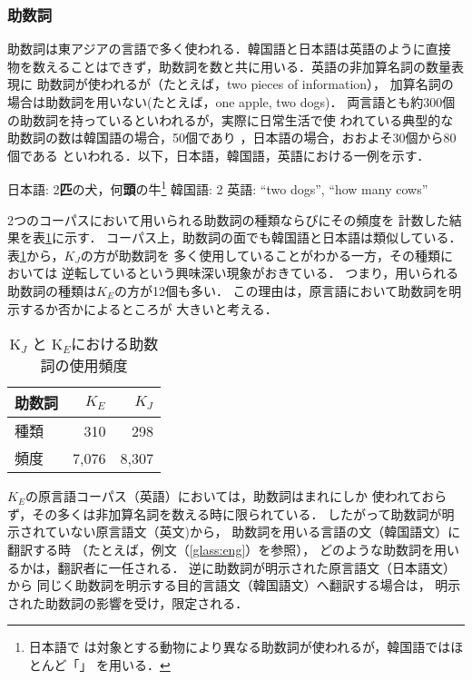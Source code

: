 \subsubsection{助数詞}
\label{num-cl}
助数詞は東アジアの言語で多く使われる．韓国語と日本語は英語のように直接
物を数えることはできず，助数詞を数と共に用いる．英語の非加算名詞の数量表現に
助数詞が使われるが（たとえば，two pieces of information），
加算名詞の場合は助数詞を用いない(たとえば，one apple, two dogs)．
両言語とも約300個の助数詞を持っているといわれるが，実際に日常生活で使
われている典型的な助数詞の数は韓国語の場合，50個であり
\cite{Unterbeck:1994}，日本語の場合，おおよそ30個から80個である
\cite{Downing:1996}といわれる．以下，日本語，韓国語，英語における一例を示す．
\begin{exe}
  \ex 
  \begin{xlist}
    \ex 日本語: 2{\bf 匹}の犬，何{\bf 頭}の牛\footnote{日本語で
    は対象とする動物により異なる助数詞が使われるが，韓国語ではほとんど「」
    を用いる．}
 \ex 韓国語: 2  
    
  \ex 英語: ``two dogs'',  ``how many cows''
  \end{xlist}
\end{exe}


2つのコーパスにおいて用いられる助数詞の種類ならびにその頻度を
計数した結果を表\ref{tab:classifier}に示す．
コーパス上，助数詞の面でも韓国語と日本語は類似している．
表\ref{tab:classifier}から，$K_J$の方が助数詞を
多く使用していることがわかる一方，その種類においては
逆転しているという興味深い現象がおきている．
つまり，用いられる助数詞の種類は$K_E$の方が12個も多い．
この理由は，原言語において助数詞を明示するか否かによるところが
大きいと考える．

\begin{table}[htb]
\begin{center}
\caption{K$_J$ と K$_E$における助数詞の使用頻度}
\label{tab:classifier}
\begin{tabular}{l|r|r}     
\hline
\hline
助数詞   &  $K_E$ &  $K_J$  \\ \hline
種類  & 310     &  298    \\
頻度 &  7,076  & 8,307  \\
\hline\hline
\end{tabular}
\end{center}
\end{table}


$K_E$の原言語コーパス（英語）においては，助数詞はまれにしか
使われておらず，その多くは非加算名詞を数える時に限られている．
したがって助数詞が明示されていない原言語文（英文)から，
助数詞を用いる言語の文（韓国語文）に翻訳する時
（たとえば，例文（\ref{glass:eng}）を参照），
どのような助数詞を用いるかは，翻訳者に一任される．
逆に助数詞が明示された原言語文（日本語文）から
同じく助数詞を明示する目的言語文（韓国語文）へ翻訳する場合は，
明示された助数詞の影響を受け，限定される．


